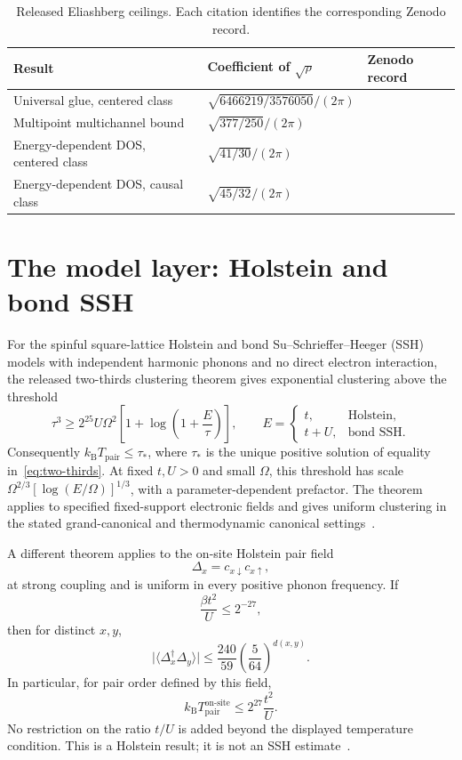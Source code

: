 \documentclass[11pt]{article}
\newcommand{\kb}{k_{\mathrm B}}
\newcommand{\Tpair}{T_{\mathrm{pair}}}
\newcommand{\taui}{\tau_*}
\begin{document}
\begin{table}[ht]
\centering
\caption{Released Eliashberg ceilings. Each citation identifies the corresponding Zenodo record.}
\begin{tabular}{@{}lll@{}}
\toprule
Result & Coefficient of $\sqrt{\rho}$ & Zenodo record\\
\midrule
Universal glue, centered class & $\sqrt{6466219/3576050}/(2\pi)$ & \cite{univglue}\\
Multipoint multichannel bound & $\sqrt{377/250}/(2\pi)$ & \cite{optimum}\\
Energy-dependent DOS, centered class & $\sqrt{41/30}/(2\pi)$ & \cite{finiteenergy}\\
Energy-dependent DOS, causal class & $\sqrt{45/32}/(2\pi)$ & \cite{finiteenergy}\\
\bottomrule
\end{tabular}
\end{table}

\section{The model layer: Holstein and bond SSH}

For the spinful square-lattice Holstein and bond Su--Schrieffer--Heeger (SSH) models with independent harmonic phonons and no direct electron interaction, the released two-thirds clustering theorem gives exponential clustering above the threshold
\begin{equation}\label{eq:two-thirds}
 \tau^3\geq 2^{25}U\Omega^2\left[1+\log\left(1+\frac{E}{\tau}\right)\right],
 \qquad E=\begin{cases}t,&\text{Holstein},\\t+U,&\text{bond SSH}.
 \end{cases}
\end{equation}
Consequently $\kb\Tpair\leq\taui$, where $\taui$ is the unique positive solution of equality in~\eqref{eq:two-thirds}. At fixed $t,U>0$ and small $\Omega$, this threshold has scale $\Omega^{2/3}[\log(E/\Omega)]^{1/3}$, with a parameter-dependent prefactor. The theorem applies to specified fixed-support electronic fields and gives uniform clustering in the stated grand-canonical and thermodynamic canonical settings~\cite{linear4}.

A different theorem applies to the on-site Holstein pair field
\[
 \Delta_x=c_{x\downarrow}c_{x\uparrow},
\]
at strong coupling and is uniform in every positive phonon frequency. If
\[
 \frac{\beta t^2}{U}\leq 2^{-27},
\]
then for distinct $x,y$,
\[
 \bigl|\langle\Delta_x^\dagger\Delta_y\rangle\bigr|
 \leq \frac{240}{59}\left(\frac{5}{64}\right)^{d(x,y)}.
\]
In particular, for pair order defined by this field,
\begin{equation}\label{eq:strong-coupling}
 \kb\Tpair^{\mathrm{on\text{-}site}}\leq 2^{27}\frac{t^2}{U}.
\end{equation}
No restriction on the ratio $t/U$ is added beyond the displayed temperature condition. This is a Holstein result; it is not an SSH estimate~\cite{stage6}.
\end{document}
